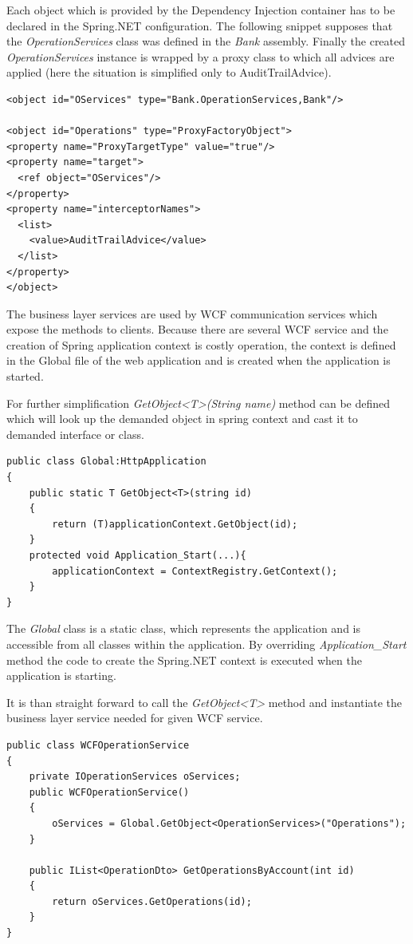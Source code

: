 Each object which is provided by the Dependency Injection container has to be declared in the Spring.NET configuration. The following snippet supposes that the \textit{OperationServices} class was defined in the \textit{Bank} assembly. Finally the created \textit{OperationServices} instance is wrapped by a proxy class to which all advices are applied (here the situation is simplified only to AuditTrailAdvice).

\begin{verbatim}
<object id="OServices" type="Bank.OperationServices,Bank"/>

<object id="Operations" type="ProxyFactoryObject">
<property name="ProxyTargetType" value="true"/>
<property name="target">
  <ref object="OServices"/>
</property>
<property name="interceptorNames">
  <list>
    <value>AuditTrailAdvice</value>
  </list>
</property>
</object>
\end{verbatim}

The business layer services are used by WCF communication services which expose the methods to clients. Because there are several WCF service and the creation of Spring application context is costly operation, the context is defined in the Global file of the web application and is created when the application is started.

For further simplification \textit{GetObject<T>(String name)} method can be defined which will look up  the demanded object in spring context and cast it to demanded interface or class.

\begin{verbatim}
public class Global:HttpApplication
{
    public static T GetObject<T>(string id)
    {
        return (T)applicationContext.GetObject(id);
    }
    protected void Application_Start(...){
    	applicationContext = ContextRegistry.GetContext();
    }
}
\end{verbatim}
The \textit{Global} class is a static class, which represents the application and is accessible from all classes within the application. By overriding \textit{Application\_Start} method the code to create the Spring.NET context is executed when the application is starting.

It is than straight forward to call the \textit{GetObject<T>} method and instantiate the business layer service needed for given WCF service.
\begin{verbatim}
public class WCFOperationService
{
    private IOperationServices oServices;
    public WCFOperationService()
    {
        oServices = Global.GetObject<OperationServices>("Operations");
    }

    public IList<OperationDto> GetOperationsByAccount(int id)
    {
        return oServices.GetOperations(id);
    }
}
\end{verbatim}


